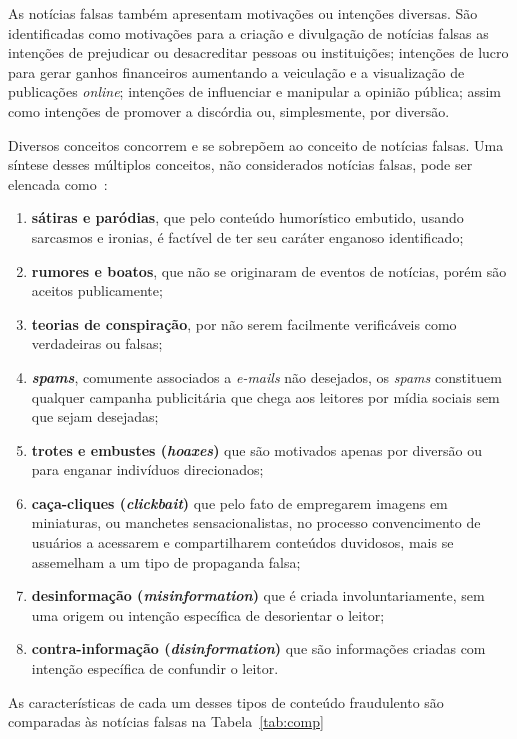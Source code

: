 \documentclass{SBCbookchapter}
\begin{document}
As notícias falsas também apresentam motivações ou intenções diversas. São identificadas como motivações para a criação e divulgação de notícias falsas as intenções de prejudicar ou desacreditar pessoas ou instituições; intenções de lucro para gerar ganhos financeiros aumentando a veiculação e a visualização de publicações \textit{online}; intenções de influenciar e manipular a opinião pública; assim como intenções de promover a discórdia ou, simplesmente, por diversão.

Diversos conceitos concorrem e se sobrepõem ao conceito de notícias falsas. Uma síntese desses múltiplos conceitos, não considerados notícias falsas, pode ser elencada como~\cite{rubin2015deception,shu2017fake,zhou2018fake,chen2015misleading}: 

\begin{enumerate}
    \item \textbf{sátiras e paródias}, que pelo conteúdo humorístico embutido, usando sarcasmos e ironias, é factível de ter seu caráter enganoso identificado; 
    \item \textbf{rumores e boatos}, que não se originaram de eventos de notícias, porém são aceitos publicamente; 
    \item  \textbf{teorias de conspiração}, por não serem facilmente verificáveis como verdadeiras ou falsas; 
    \item \textbf{\textit{spams}}, comumente associados a \textit{e-mails} não desejados, os \textit{spams} constituem  qualquer campanha publicitária que chega aos leitores por mídia sociais sem que sejam desejadas; 
    \item \textbf{trotes e embustes (\textit{hoaxes})} que são motivados apenas por diversão ou para enganar indivíduos direcionados; 
    \item \textbf{caça-cliques (\textit{clickbait})} que pelo fato de empregarem imagens em miniaturas, ou manchetes sensacionalistas, no processo convencimento de usuários a acessarem e compartilharem conteúdos duvidosos, mais se assemelham a um tipo de propaganda falsa;
    \item \textbf{desinformação (\textit{misinformation})} que é criada involuntariamente, sem uma origem ou intenção específica de desorientar o leitor; 
    \item \textbf{contra-informação (\textit{disinformation})} que são informações criadas com intenção específica de confundir o leitor.
\end{enumerate}

As características de cada um desses tipos de conteúdo fraudulento são comparadas às notícias falsas na Tabela~\ref{tab:comp}
\end{document}
